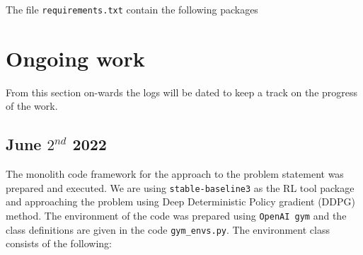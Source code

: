 \documentclass{article}
\begin{document}
The file \texttt{requirements.txt} contain the following packages

\section{Ongoing work} \label{updates}

From this section on-wards the logs will be dated to keep a track on the progress of the work.
\subsection{June $2^{nd}$ 2022}
The monolith code framework for the approach to the problem statement was prepared and executed. We are using \texttt{stable-baseline3} as the RL tool package and approaching the problem using Deep Deterministic Policy gradient (DDPG) method. The environment of the code was prepared using \texttt{OpenAI gym} and the class definitions are given in the code \texttt{gym\_envs.py}. The environment class consists of the following:
\end{document}
